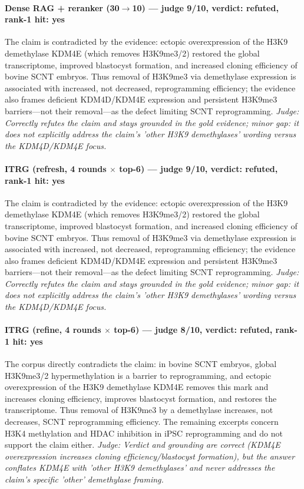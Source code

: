 \documentclass[sigconf, review, anonymous]{acmart}
\begin{document}
\paragraph{Dense RAG + reranker (30$\to$10) --- judge 9/10, verdict: refuted, rank-1 hit: yes}
\noindent The claim is contradicted by the evidence: ectopic overexpression of the H3K9 demethylase KDM4E (which removes H3K9me3/2) restored the global transcriptome, improved blastocyst formation, and increased cloning efficiency of bovine SCNT embryos. Thus removal of H3K9me3 via demethylase expression is associated with increased, not decreased, reprogramming efficiency; the evidence also frames deficient KDM4D/KDM4E expression and persistent H3K9me3 barriers---not their removal---as the defect limiting SCNT reprogramming.
\noindent\small\textit{Judge: Correctly refutes the claim and stays grounded in the gold evidence; minor gap: it does not explicitly address the claim's 'other H3K9 demethylases' wording versus the KDM4D/KDM4E focus.}
\paragraph{ITRG (refresh, 4 rounds $\times$ top-6) --- judge 9/10, verdict: refuted, rank-1 hit: yes}
\noindent The claim is contradicted by the evidence: ectopic overexpression of the H3K9 demethylase KDM4E (which removes H3K9me3/2) restored the global transcriptome, improved blastocyst formation, and increased cloning efficiency of bovine SCNT embryos. Thus removal of H3K9me3 via demethylase expression is associated with increased, not decreased, reprogramming efficiency; the evidence also frames deficient KDM4D/KDM4E expression and persistent H3K9me3 barriers---not their removal---as the defect limiting SCNT reprogramming.
\noindent\small\textit{Judge: Correctly refutes the claim and stays grounded in the gold evidence; minor gap: it does not explicitly address the claim's 'other H3K9 demethylases' wording versus the KDM4D/KDM4E focus.}
\paragraph{ITRG (refine, 4 rounds $\times$ top-6) --- judge 8/10, verdict: refuted, rank-1 hit: yes}
\noindent The corpus directly contradicts the claim: in bovine SCNT embryos, global H3K9me3/2 hypermethylation is a barrier to reprogramming, and ectopic overexpression of the H3K9 demethylase KDM4E removes this mark and increases cloning efficiency, improves blastocyst formation, and restores the transcriptome. Thus removal of H3K9me3 by a demethylase increases, not decreases, SCNT reprogramming efficiency. The remaining excerpts concern H3K4 methylation and HDAC inhibition in iPSC reprogramming and do not support the claim either.
\noindent\small\textit{Judge: Verdict and grounding are correct (KDM4E overexpression increases cloning efficiency/blastocyst formation), but the answer conflates KDM4E with 'other H3K9 demethylases' and never addresses the claim's specific 'other' demethylase framing.}
\end{document}
